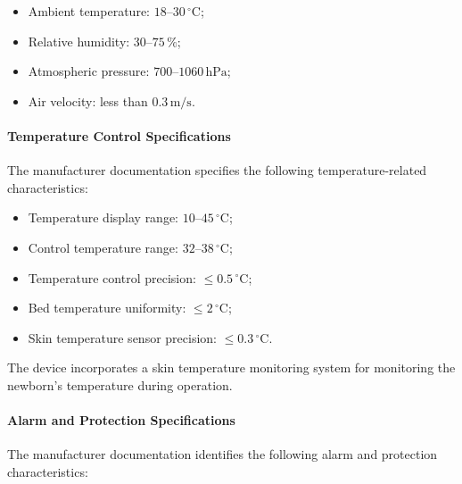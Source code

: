 \begin{itemize}
    \item Ambient temperature: \(18\text{--}30\,^\circ\mathrm{C}\);
    \item Relative humidity: \(30\text{--}75\,\%\);
    \item Atmospheric pressure: \(700\text{--}1060\,\mathrm{hPa}\);
    \item Air velocity: less than \(0.3\,\mathrm{m/s}\).
\end{itemize}


\paragraph{Temperature Control Specifications}

The manufacturer documentation specifies the following
temperature-related characteristics:

\begin{itemize}
    \item Temperature display range: \(10\text{--}45\,^\circ\mathrm{C}\);
    \item Control temperature range: \(32\text{--}38\,^\circ\mathrm{C}\);
    \item Temperature control precision: \(\leq 0.5\,^\circ\mathrm{C}\);
    \item Bed temperature uniformity: \(\leq 2\,^\circ\mathrm{C}\);
    \item Skin temperature sensor precision:
    \(\leq 0.3\,^\circ\mathrm{C}\).
\end{itemize}

The device incorporates a skin temperature monitoring system for
monitoring the newborn's temperature during operation.


\paragraph{Alarm and Protection Specifications}

The manufacturer documentation identifies the following alarm and
protection characteristics:

